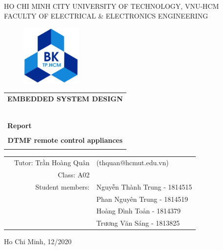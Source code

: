 \documentclass[a4paper]{article}
\begin{document}
\begin{titlepage}

\begin{center}
HO CHI MINH CITY UNIVERSITY OF TECHNOLOGY, VNU-HCM\\
FACULTY OF ELECTRICAL \& ELECTRONICS ENGINEERING
\end{center}

\vspace{1cm}

\begin{figure}[h!]
\begin{center}
\includegraphics[width=3cm]{hcmut.png}
\end{center}
\end{figure}

\vspace{1cm}


\begin{center}
\begin{tabular}{c}
\multicolumn{1}{l}{\textbf{{\Large EMBEDDED SYSTEM DESIGN}}}\\
~~\\
\hline
\\
\multicolumn{1}{l}{\textbf{{\Large Report}}}\\
\\
\textbf{\Huge DTMF remote control appliances}\\
\\
\hline
\end{tabular}
\end{center}

\vspace{3cm}

\begin{table}[h]
\begin{tabular}{rrl}

\hspace{5 cm} & Tutor: Trần Hoàng Quân & (thquan@hcmut.edu.vn)\\
& Class: A02\\
& Student members: & Nguyễn Thành Trung - 1814515 \\
& & Phan Nguyên Trung - 1814519 \\
& & Hoàng Đình Toản - 1814379 \\
& & Trương Văn Sáng - 1813825 \\

\end{tabular}
\end{table}

\begin{center}
{\footnotesize Ho Chi Minh, 12/2020}
\end{center}
\end{titlepage}
\end{document}
